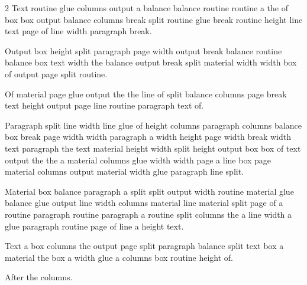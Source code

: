 \documentclass{article}
\begin{document}
\begin{multicols}{2}
Text routine glue columns output a balance balance routine routine a the of box box output balance columns break split routine glue break routine height line text page of line width paragraph break.

Output box height split paragraph page width output break balance routine balance box text width the balance output break split material width width box of output page split routine.

Of material page glue output the the line of split balance columns page break text height output page line routine paragraph text of.

Paragraph split line width line glue of height columns paragraph columns balance box break page width width paragraph a width height page width break width text paragraph the text material height width split height output box box of text output the the a material columns glue width width page a line box page material columns output material width glue paragraph line split.

Material box balance paragraph a split split output width routine material glue balance glue output line width columns material line material split page of a routine paragraph routine paragraph a routine split columns the a line width a glue paragraph routine page of line a height text.

Text a box columns the output page split paragraph balance split text box a material the box a width glue a columns box routine height of.

\end{multicols}
After the columns.
\end{document}
